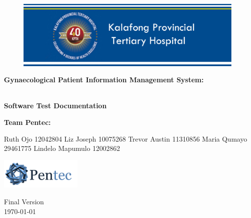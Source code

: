 \begin{titlepage}
	\begin{center}
		
		\begin{figure}[t]
			\centering
			\includegraphics[width=450px]{./Graphics/KPTH_Logo}
		\end{figure}		
		
		\textbf{\LARGE Gynaecological Patient Information
		Management System:}
		
		\vspace{1 cm}
	    \textbf{\LARGE \\Software Test Documentation}
		
		\vspace{1 cm}
		\LARGE{\textbf{Team Pentec: }}
		

		\begin{flushright} \large
			
			Ruth Ojo 12042804\newline
			Liz Joseph 10075268\newline
			Trevor Austin 11310856\newline
			Maria Qumayo 29461775\newline
			Lindelo Mapumulo 12002862\newline
		\end{flushright}
		
				\vspace{1 cm}
				\centering
				\includegraphics[width=150px]{./Graphics/Pentec_Logo.png}

		
		
		{\LARGE Final Version}
		\\
		{\large \today}		
		
		
	\end{center}
\end{titlepage}